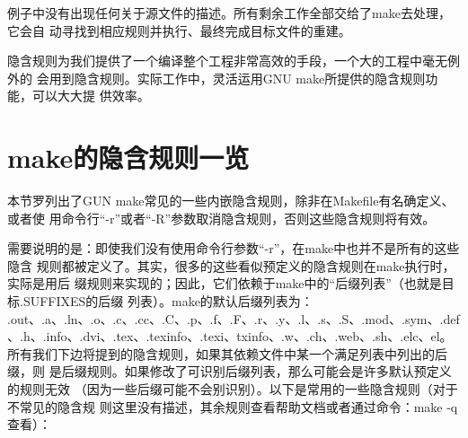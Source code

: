 例子中没有出现任何关于源文件的描述。所有剩余工作全部交给了make去处理，它会自
动寻找到相应规则并执行、最终完成目标文件的重建。

隐含规则为我们提供了一个编译整个工程非常高效的手段，一个大的工程中毫无例外的
会用到隐含规则。实际工作中，灵活运用GNU make所提供的隐含规则功能，可以大大提
供效率。

\section{make的隐含规则一览}
本节罗列出了GUN make常见的一些内嵌隐含规则，除非在Makefile有名确定义、或者使%
用命令行“-r”或者“-R”参数取消隐含规则，否则这些隐含规则将有效。%

需要说明的是：即使我们没有使用命令行参数“-r”，在make中也并不是所有的这些隐含%
规则都被定义了。其实，很多的这些看似预定义的隐含规则在make执行时，实际是用后%
缀规则来实现的；因此，它们依赖于make中的“后缀列表”（也就是目标.SUFFIXES的后缀%
列表）。make的默认后缀列表为：%
.out、.a、.ln、.o、.c、.cc、.C、.p、.f、.F、.r、.y、.l、.s、.S、.mod、.sym、.def、.h、.info、.dvi、.tex、.texinfo、.texi、txinfo、.w、.ch、.web、.sh、.elc、el。
所有我们下边将提到的隐含规则，如果其依赖文件中某一个满足列表中列出的后缀，则%
是后缀规则。如果修改了可识别后缀列表，那么可能会是许多默认预定义的规则无效%
（因为一些后缀可能不会别识别）。以下是常用的一些隐含规则（对于不常见的隐含规%
则这里没有描述，其余规则查看帮助文档或者通过命令：make -q 查看）：

